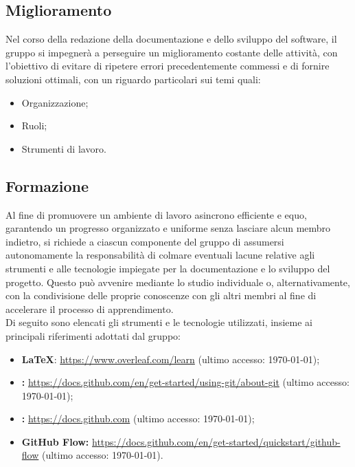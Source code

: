 \subsection{Miglioramento} \label{sec:miglioramento}
Nel corso della redazione della documentazione e dello sviluppo del software, il gruppo si impegnerà a perseguire un miglioramento costante delle attività, con l'obiettivo di evitare di ripetere errori precedentemente commessi e di fornire soluzioni ottimali, con un riguardo particolari sui temi quali:
\begin{itemize}
  \item Organizzazione;
  \item Ruoli;
  \item Strumenti di lavoro.
\end{itemize}
\subsection{Formazione} \label{sec:formazione}
Al fine di promuovere un ambiente di lavoro asincrono efficiente e equo, garantendo un progresso organizzato e uniforme senza lasciare alcun membro indietro, si richiede a ciascun componente del gruppo di assumersi autonomamente la responsabilità di colmare eventuali lacune relative agli strumenti e alle tecnologie impiegate per la documentazione e lo sviluppo del progetto. Questo può avvenire mediante lo studio individuale o, alternativamente, con la condivisione delle proprie conoscenze con gli altri membri al fine di accelerare il processo di apprendimento.
\\Di seguito sono elencati gli strumenti e le tecnologie utilizzati, insieme ai principali riferimenti adottati dal gruppo:
\begin{itemize}
    \item \textbf{LaTeX}: \href{https://www.overleaf.com/learn}{https://www.overleaf.com/learn}
        (ultimo accesso: \today);
    \item \textbf{:}
        \href{https://docs.github.com/en/get-started/using-git/about-git.}{https://docs.github.com/en/get-started/using-git/about-git}
        (ultimo accesso: \today);
    \item \textbf{:} \href{https://docs.github.com}{https://docs.github.com} (ultimo accesso: \today);
    \item \textbf{GitHub Flow:}
        \href{https://docs.github.com/en/get-started/quickstart/github-flow}{https://docs.github.com/en/get-started/quickstart/github-flow}
        (ultimo accesso: \today).
\end{itemize}
